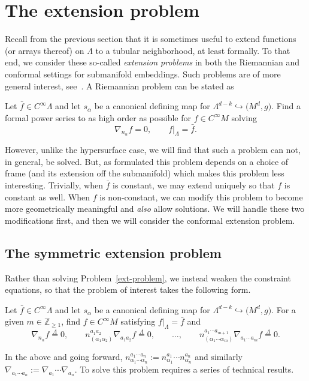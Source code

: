 \documentclass[10pt,a4paper]{article}
\numberwithin{equation}{section}
\renewcommand{\=}{\stackrel \Lambda =}
\begin{document}
\section{The extension problem} \label{ext-prob-sec}
Recall from the previous section that it is sometimes useful to extend functions (or arrays thereof) on $\Lambda$ to a tubular neighborhood, at least formally. To that end, we consider these so-called \textit{extension problems} in both the Riemannian and conformal settings for submanifold embeddings. Such problems are of more general interest, see~\cite{GW}. A Riemannian problem can be stated as
\begin{Problem} \label{ext-problem}
Let $\bar{f} \in C^\infty \Lambda$ and let $s_{\alpha}$ be a canonical defining map for $\Lambda^{d-k} \hookrightarrow \bigl(M^d,g\bigr)$. Find a formal power series to as high order as possible for $f \in C^\infty M$ solving
\[\nabla_{n_{\alpha}} f = 0 , \qquad f|_{\Lambda} = \bar{f} .\]
\end{Problem}
However, unlike the hypersurface case, we will find that such a problem can not, in general, be solved. But, as formulated this problem depends on a choice of frame (and its extension off the submanifold) which makes this problem less interesting. Trivially, when $\bar{f}$ is constant, we may extend uniquely so that $f$ is constant as well. When $f$ is non-constant, we can modify this problem to become more geometrically meaningful and \textit{also} allow solutions. We will handle these two modifications first, and then we will consider the conformal extension problem.

\subsection{The symmetric extension problem}
Rather than solving Problem~\ref{ext-problem}, we instead weaken the constraint equations, so that the problem of interest takes the following form.

\begin{Problem} \label{sym-ext-problem}
Let $\bar{f} \in C^\infty \Lambda$ and let $s_{\alpha}$ be a canonical defining map for $\Lambda^{d-k} \hookrightarrow \bigl(M^d,g\bigr)$. For a given $m \in \mathbb{Z}_{\geq 1}$, find $f \in C^\infty M$ satisfying $f|_{\Lambda} = \bar{f}$ and
\[\nabla_{n_{\alpha}} f \= 0 , \qquad n^{a_1 a_2}_{(\alpha_1 \alpha_2)} \nabla_{a_1 a_2} f \= 0 , \qquad \ldots , \qquad n^{a_1 \cdots a_{m+1}}_{(\alpha_1 \cdots \alpha_{m})} \nabla_{a_1 \cdots a_{m}} f \= 0 .\]
\end{Problem}
\noindent
In the above and going forward, $n^{a_1 \cdots a_n}_{\alpha_1 \cdots \alpha_n} := n^{a_1}_{\alpha_1} \cdots n^{a_n}_{\alpha_n}$ and similarly $\nabla_{a_1 \cdots a_n} := \nabla_{a_1} \cdots \nabla_{a_n}$. To solve this problem requires a series of technical results.
\end{document}
